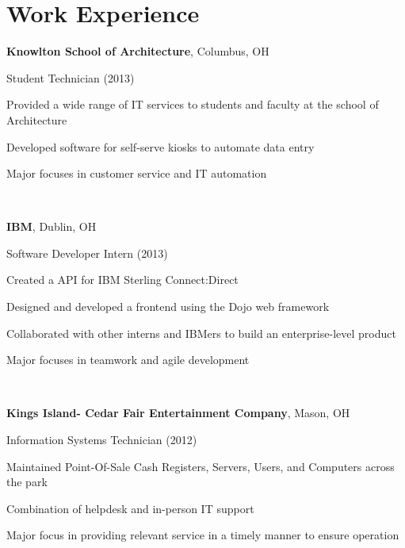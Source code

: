 \documentclass[letterpaper]{resume}
\begin{document}
\section{Work Experience}
\textbf{Knowlton School of Architecture}, Columbus, OH

Student Technician (2013)
\begin{compactitem}
\item Provided a wide range of IT services to students and faculty at the
	school of Architecture
\item Developed software for self-serve kiosks to automate data entry
\item Major focuses in customer service and IT automation
\end{compactitem}

~

\textbf{IBM}, Dublin, OH

Software Developer Intern (2013)
\begin{compactitem}
\item Created a API for IBM Sterling Connect:Direct

\item Designed and developed a frontend using the Dojo web framework

\item Collaborated with other interns and IBMers to build an enterprise-level product

\item Major focuses in teamwork and agile development
\end{compactitem}

~

\textbf{Kings Island- Cedar Fair Entertainment Company}, Mason, OH

Information Systems Technician (2012)
\begin{compactitem}
\item Maintained Point-Of-Sale Cash Registers, Servers, Users, and Computers across the park

\item Combination of helpdesk and in-person IT support


\item Major focus in providing relevant service in a timely manner to ensure operation
\end{compactitem}
\end{document}
